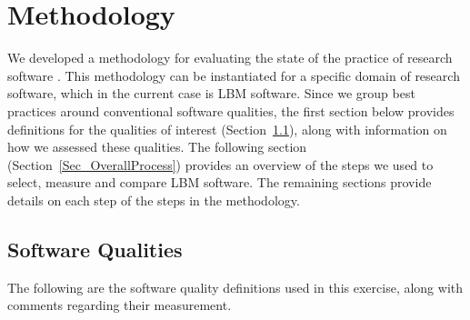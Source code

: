 \documentclass[final, 3p, times, authoryear]{elsarticle}
\begin{document}
\section{Methodology} \label{methodology}

We developed a methodology for evaluating the state of the practice of
research software \citep{SmithEtAl2021}. This methodology can be instantiated
for a specific domain of research software, which in the current case is LBM
software.  Since we group best practices around conventional software qualities,
the first section below provides definitions for the qualities of interest
(Section~\ref{softwarequalities}), along with information on how we assessed
these qualities. The following section (Section~\ref{Sec_OverallProcess})
provides an overview of the steps we used to select, measure and compare LBM
software.  The remaining sections provide details on each step of the steps in
the methodology. 

\subsection{Software Qualities} \label{softwarequalities}

The following are the software quality definitions used in this exercise, along
with comments regarding their measurement.
\end{document}
